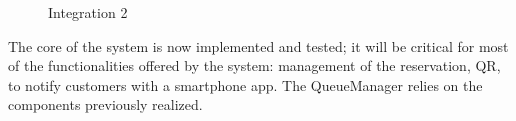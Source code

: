 \begin{figure}[H]
	\noindent
	\caption{Integration 2} %
\end{figure}
The core of the system is now implemented and tested; it will be critical for most of the functionalities offered by the system: management of the reservation, QR, to notify customers with a smartphone app. The QueueManager relies on the components previously realized.

